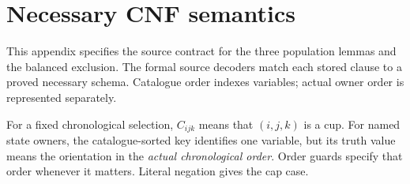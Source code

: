 \section{Necessary CNF semantics}\label{app:cnf}
This appendix specifies the source contract for the three population
lemmas and the balanced exclusion. The formal source decoders match each
stored clause to a proved necessary schema. Catalogue order indexes
variables; actual owner order is represented separately.

For a fixed chronological selection, $C_{ijk}$ means that $(i,j,k)$
is a cup. For named state owners, the catalogue-sorted key identifies
one variable, but its truth value means the orientation in the
\emph{actual chronological order}. Order guards specify that order
whenever it matters. Literal negation gives the cap case.

